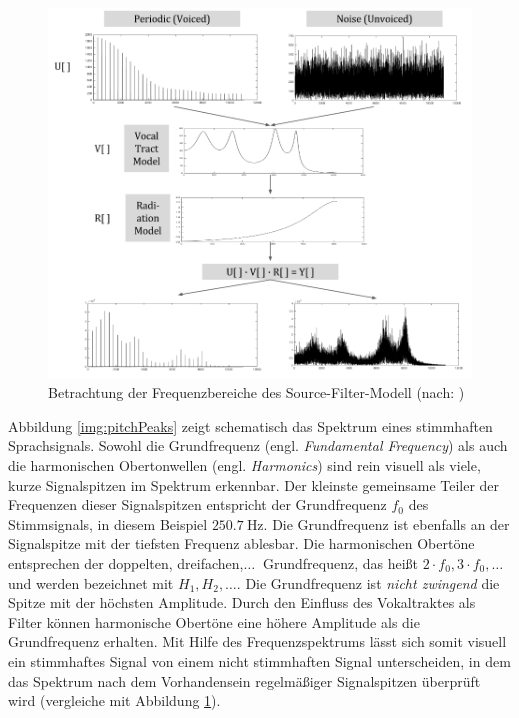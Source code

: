 \begin{figure}[h]
	\centering
	\includegraphics[width=1\textwidth]{bilder/sourceFilterSpectra.png}
	\caption[Betrachtung der Frequenzbereiche des Source-Filter-Modell]{Betrachtung der Frequenzbereiche des Source-Filter-Modell (nach: \cite[\emph{Source Estimation}, S. 3]{ricardo_ceps})}
	\label{img:sourceFilerSpectra}
\end{figure}	

Abbildung \ref{img:pitchPeaks} zeigt schematisch das Spektrum eines stimmhaften Sprachsignals. Sowohl die Grundfrequenz (engl. \emph{Fundamental Frequency}) als auch die harmonischen Obertonwellen (engl. \emph{Harmonics}) sind rein visuell als \glqq viele, kurze Signalspitzen\grqq{} im Spektrum erkennbar. Der kleinste gemeinsame Teiler der Frequenzen dieser Signalspitzen entspricht der Grundfrequenz $f_0$ des Stimmsignals, in diesem Beispiel $\SI{250.7}{\hertz}$. Die Grundfrequenz ist ebenfalls an der Signalspitze mit der tiefsten Frequenz ablesbar. Die harmonischen Obertöne entsprechen der doppelten, dreifachen,$\ldots\ $ Grundfrequenz, das heißt $2\cdot f_0, 3\cdot f_0, \ldots$ und werden bezeichnet mit $H_1, H_2, \ldots$. Die Grundfrequenz ist \emph{nicht zwingend} die Spitze mit der höchsten Amplitude. Durch den Einfluss des Vokaltraktes als Filter können harmonische Obertöne eine höhere Amplitude als die Grundfrequenz erhalten. Mit Hilfe des Frequenzspektrums lässt sich somit visuell ein stimmhaftes Signal von einem nicht stimmhaften Signal unterscheiden, in dem das Spektrum nach dem Vorhandensein regelmäßiger Signalspitzen überprüft wird (vergleiche mit Abbildung \ref{img:sourceFilerSpectra}).\cite[S. 52 - 53]{sprachverarbeitung}

